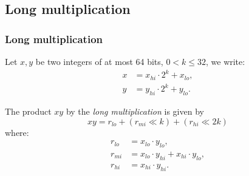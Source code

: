 \documentclass[10pt]{beamer}
\begin{document}
\subsection{Long multiplication}
\begin{frame}
    \frametitle{Long multiplication}
    Let $x,y$ be two integers of at most 64 bits, $0 < k \leq 32$, we write:
    \begin{align*}
        x &= x_{hi} \cdot 2^k + x_{lo}, \\
        y &= y_{hi} \cdot 2^k + y_{lo}.
    \end{align*}

    \pause
    \begin{mybox}
        The product $xy$ by the \textit{long multiplication} is given by
        $$xy = r_{lo} + (r_{mi} \ll k) + (r_{hi} \ll 2k)$$
        where:
        \begin{align*}
            r_{lo} &= x_{lo} \cdot y_{lo}, \\
            r_{mi} &= x_{lo} \cdot y_{hi} + x_{hi} \cdot y_{lo}, \\
            r_{hi} &= x_{hi} \cdot y_{hi}. 
        \end{align*}
    \end{mybox}
\end{frame}
\end{document}
